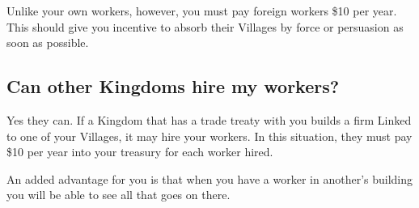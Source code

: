 Unlike your own workers, however, you must pay foreign workers \$10 per year. This should give you incentive to absorb their Villages by force or persuasion as soon as possible.

\subsection{Can other Kingdoms hire my workers?}

Yes they can. If a Kingdom that has a trade treaty with you builds a firm Linked to one of your Villages, it may hire your workers. In this situation, they must pay \$10 per year into your treasury for each worker hired.

An added advantage for you is that when you have a worker in another’s building you will be able to see all that goes on there.